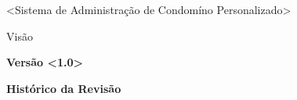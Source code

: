 \documentclass[a4paper]{article}
\title{}
\author{}
\date{}
\begin{document}
\clearpage\setcounter{page}{1}\pagestyle{Standard}

\bigskip

{\raggedleft
{\textless}Sistema de Administração de Condomíno Personalizado{\textgreater}
\par}

{\raggedleft
Visão
\par}


\bigskip

{\raggedleft
\textbf{Vers\~ao {\textless}1.0{\textgreater}}
\par}


\bigskip


\bigskip



{\centering
\textbf{Hist\'orico da Revis\~ao}
\par}
\end{document}
